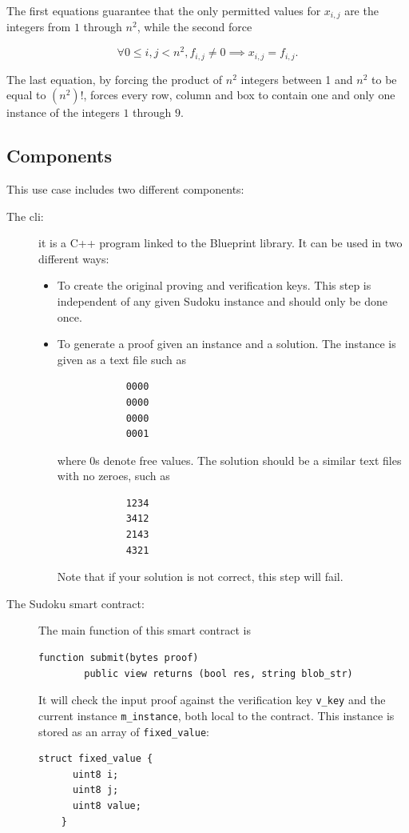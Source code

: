 \documentclass[10pt,a4paper]{article}
\begin{document}
The first equations guarantee that the only permitted values for $x_{i,j}$ are the integers from $1$ through $n^2$, while the second force

\[ \forall 0 \leq i,j < n^2, f_{i,j} \neq 0 \implies x_{i,j} = f_{i,j}.\]

The last equation, by forcing the product of $n^2$ integers between 1 and $n^2$ to be equal to $\left(n^2\right)!$, forces every row, column and box to contain one and only one instance of the integers $1$ through $9$.


\subsection{Components}
\label{subsec:components}

This use case includes two different components:

\begin{description}
	\item[The cli:] it is a C++ program linked to the Blueprint \zksnarks{} library. It can be used in two different ways:
	\begin{itemize}
		\item To create the original proving and verification keys. This step is independent of any given Sudoku instance and should only be done once.
		\item To generate a proof given an instance and a solution. The instance is given as a text file such as

		\begin{verbatim}
			0000
			0000
			0000
			0001
		\end{verbatim}

		where $0$s denote free values. The solution should be a similar text files with no zeroes, such as

		\begin{verbatim}
			1234
			3412
			2143
			4321
		\end{verbatim}

		Note that if your solution is not correct, this step will fail.
	\end{itemize}
    \item[The Sudoku smart contract:] The main function of this smart contract is
    \begin{lstlisting}[language=Solidity]
    function submit(bytes proof)
        public view returns (bool res, string blob_str)
    \end{lstlisting}
    It will check the input proof against the verification key \lstinline[language=Solidity]|v_key| and the current instance \lstinline[language=Solidity]|m_instance|, both local to the contract. This instance is stored as an array of \lstinline[language=Solidity]|fixed_value|:
    \begin{lstlisting}[language=Solidity]
    struct fixed_value {
      uint8 i;
      uint8 j;
      uint8 value;
    }

    \end{lstlisting}
\end{description}
\end{document}
